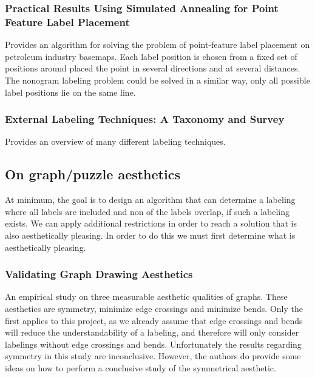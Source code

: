 \documentclass[a4paper]{article}
\begin{document}
\subsubsection{Practical Results Using Simulated Annealing for Point Feature Label Placement \cite{zoraster1997practical}}
Provides an algorithm for solving the problem of point-feature label placement on petroleum industry basemaps. Each label position is chosen from a fixed set of positions around placed the point in several directions and at several distances.  The nonogram labeling problem could be solved in a similar way, only all possible label positions lie on the same line.

\subsubsection{External Labeling Techniques: A Taxonomy and Survey \cite{bekos2019external}}
Provides an overview of many different labeling techniques.

\subsection{On graph/puzzle aesthetics}
At minimum, the goal is to design an algorithm that can determine a labeling where all labels are included and non of the labels overlap, if such a labeling exists. We can apply additional restrictions in order to reach a solution that is also aesthetically pleasing. In order to do this we must first determine what is aesthetically pleasing.\\

\subsubsection{Validating Graph Drawing Aesthetics \cite{purchase1995validating}}
An empirical study on three measurable aesthetic qualities of graphs. These aesthetics are symmetry, minimize edge crossings and minimize bends. Only the first applies to this project, as we already assume that edge crossings and bends will reduce the understandability of a labeling, and therefore will only consider labelings without edge crossings and bends. Unfortunately the results regarding symmetry in this study are inconclusive. However, the authors do provide some ideas on how to perform a conclusive study of the symmetrical aesthetic.\\
\end{document}
